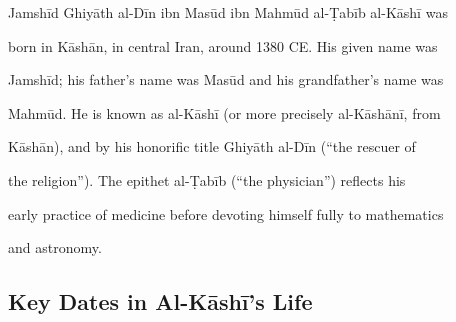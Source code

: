 \documentclass[11pt,a4paper]{article}
\begin{document}
\label{app:biography}



Jamsh\=id Ghiy\=ath al-D\=in ibn Mas\=ud ibn Mahm\=ud al-\d{T}ab\=ib al-K\=ash\=i was

born in K\=ash\=an, in central Iran, around 1380 CE. His given name was

Jamsh\=id; his father's name was Mas\=ud and his grandfather's name was

Mahm\=ud. He is known as al-K\=ash\=i (or more precisely al-K\=ash\=an\=i, from

K\=ash\=an), and by his honorific title Ghiy\=ath al-D\=in (``the rescuer of

the religion''). The epithet al-\d{T}ab\=ib (``the physician'') reflects his

early practice of medicine before devoting himself fully to mathematics

and astronomy.



\subsection{Key Dates in Al-K\=ash\=i's Life}
\end{document}
